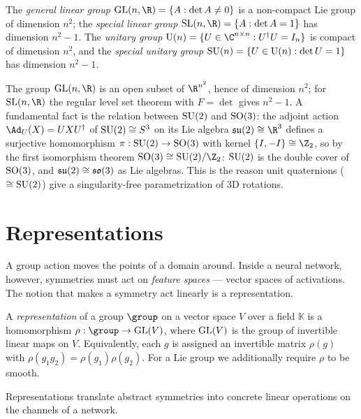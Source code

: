 \begin{definition}
\label{def:found:linear-unitary}
The \emph{general linear group} $\GL(n,\R) = \{A : \det A \ne 0\}$ is a
non-compact Lie group of dimension $n^2$; the \emph{special linear group}
$\SL(n,\R) = \{A : \det A = 1\}$ has dimension $n^2 - 1$. The \emph{unitary group}
$\U(n) = \{U \in \C^{n\times n} : U^\dagger U = I_n\}$ is compact of dimension
$n^2$, and the \emph{special unitary group} $\operatorname{SU}(n) = \{U \in \operatorname{U}(n) : \det U =
1\}$ has dimension $n^2 - 1$.
\end{definition}

The group $\GL(n,\R)$ is an open subset of $\R^{n^2}$, hence of dimension $n^2$;
for $\SL(n,\R)$ the regular level set theorem with $F = \det$ gives $n^2 - 1$. A
fundamental fact is the relation between $\operatorname{SU}(2)$ and $\operatorname{SO}(3)$: the adjoint action
$\Ad_U(X) = UXU^\dagger$ of $\operatorname{SU}(2) \cong S^3$ on its Lie algebra $\Lie{su}(2)
\cong \R^3$ defines a surjective homomorphism $\pi : \operatorname{SU}(2) \to \operatorname{SO}(3)$ with
kernel $\{I, -I\} \cong \Z_2$, so by the first isomorphism theorem
$\SO(3) \cong \SU(2)/\Z_2$: $\operatorname{SU}(2)$ is the double cover of $\operatorname{SO}(3)$, and
$\mathfrak{su}(2) \cong \mathfrak{so}(3)$ as Lie algebras. This is the reason unit
quaternions ($\cong \operatorname{SU}(2)$) give a singularity-free parametrization of 3D
rotations.

\section{Representations}
\label{sec:found:representations}

A group action moves the points of a domain around. Inside a neural network,
however, symmetries must act on \emph{feature spaces} --- vector spaces of
activations. The notion that makes a symmetry act linearly is a representation.

\begin{definition}[Representation]
\label{def:found:representation}
A \emph{representation} of a group $\group$ on a vector space $V$ over a field
$\mathbb{K}$ is a homomorphism $\rho : \group \to \GL(V)$, where $\operatorname{GL}(V)$ is the
group of invertible linear maps on $V$. Equivalently, each $g$ is assigned an
invertible matrix $\rho(g)$ with $\rho(g_1 g_2) = \rho(g_1)\rho(g_2)$. For a Lie
group we additionally require $\rho$ to be smooth.
\end{definition}

Representations translate abstract symmetries into concrete linear operations on
the channels of a network.

